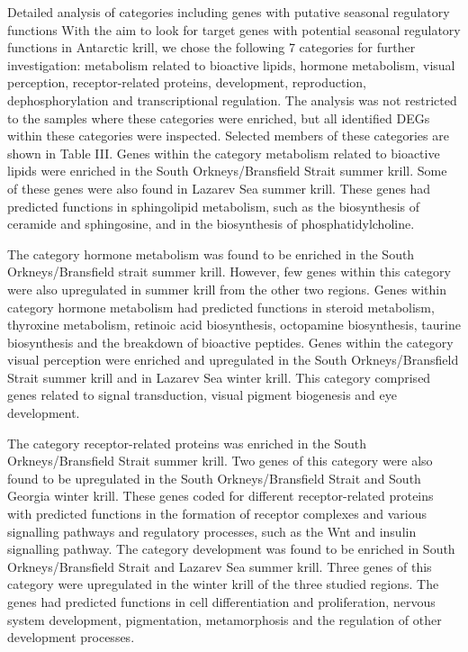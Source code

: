 Detailed analysis of categories including genes with putative seasonal regulatory functions
With the aim to look for target genes with potential seasonal regulatory functions in Antarctic krill, we chose the following 7 categories for further investigation: metabolism related to bioactive lipids, hormone metabolism, visual perception, receptor-related proteins, development, reproduction, dephosphorylation and transcriptional regulation. The analysis was not restricted to the samples where these categories were enriched, but all identified DEGs within these categories were inspected. Selected members of these categories are shown in Table III. 
Genes within the category metabolism related to bioactive lipids were enriched in the South Orkneys/Bransfield Strait summer krill. Some of these genes were also found in Lazarev Sea summer krill. These genes had predicted functions in sphingolipid metabolism, such as the biosynthesis of ceramide and sphingosine, and in the biosynthesis of phosphatidylcholine.

The category hormone metabolism was found to be enriched in the South Orkneys/Bransfield strait summer krill. However, few genes within this category were also upregulated in summer krill from the other two regions. Genes within category hormone metabolism had predicted functions in steroid metabolism, thyroxine metabolism, retinoic acid biosynthesis, octopamine biosynthesis, taurine biosynthesis and the breakdown of bioactive peptides.
Genes within the category visual perception were enriched and upregulated in the South Orkneys/Bransfield Strait summer krill and in Lazarev Sea winter krill. This category comprised genes related to signal transduction, visual pigment biogenesis and eye development.

The category receptor-related proteins was enriched in the South Orkneys/Bransfield Strait summer krill. Two genes of this category were also found to be upregulated in the South Orkneys/Bransfield Strait and South Georgia winter krill. These genes coded for different receptor-related proteins with predicted functions in the formation of receptor complexes and various signalling pathways and regulatory processes, such as the Wnt and insulin signalling pathway.
The category development was found to be enriched in South Orkneys/Bransfield Strait and Lazarev Sea summer krill. Three genes of this category were upregulated in the winter krill of the three studied regions. The genes had predicted functions in cell differentiation and proliferation, nervous system development, pigmentation, metamorphosis and the regulation of other development processes.

